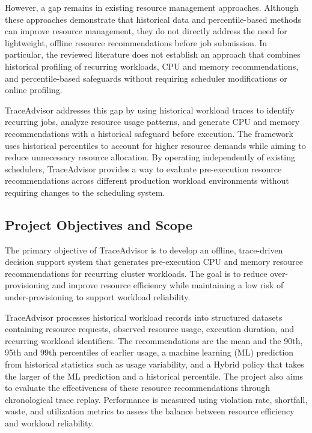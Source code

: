 \documentclass{IEEEtran}
\begin{document}
However, a gap remains in existing resource management approaches. Although these approaches demonstrate that historical data and percentile-based methods can improve resource management, they do not directly address the need for lightweight, offline resource recommendations before job submission. In particular, the reviewed literature does not establish an approach that combines historical profiling of recurring workloads, CPU and memory recommendations, and percentile-based safeguards without requiring scheduler modifications or online profiling.

TraceAdvisor addresses this gap by using historical workload traces to identify recurring jobs, analyze resource usage patterns, and generate CPU and memory recommendations with a historical safeguard before execution. The framework uses historical percentiles to account for higher resource demands while aiming to reduce unnecessary resource allocation. By operating independently of existing schedulers, TraceAdvisor provides a way to evaluate pre-execution resource recommendations across different production workload environments without requiring changes to the scheduling system.

\subsection{Project Objectives and Scope}\label{sec:1.4}

The primary objective of TraceAdvisor is to develop an offline, trace-driven decision support system that generates pre-execution CPU and memory resource recommendations for recurring cluster workloads. The goal is to reduce over-provisioning and improve resource efficiency while maintaining a low risk of under-provisioning to support workload reliability.

TraceAdvisor processes historical workload records into structured datasets containing resource requests, observed resource usage, execution duration, and recurring workload identifiers. The recommendations are the mean and the 90th, 95th and 99th percentiles of earlier usage, a machine learning (ML) prediction from historical statistics such as usage variability, and a Hybrid policy that takes the larger of the ML prediction and a historical percentile. The project also aims to evaluate the effectiveness of these resource recommendations through chronological trace replay. Performance is measured using violation rate, shortfall, waste, and utilization metrics to assess the balance between resource efficiency and workload reliability.
\end{document}
